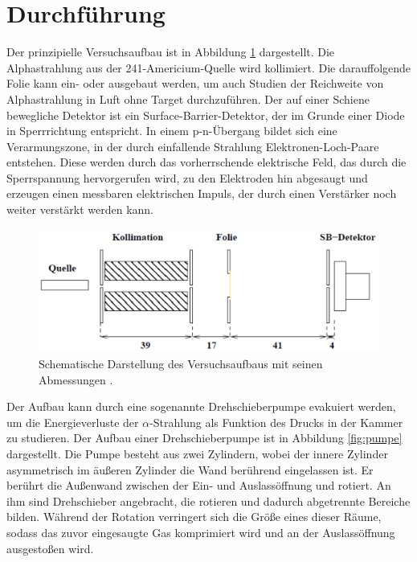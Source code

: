 \section{Durchführung}
\label{sec:Durchführung}

Der prinzipielle Versuchsaufbau ist in Abbildung \ref{fig:aufbau} dargestellt. Die Alphastrahlung aus der 241-Americium-Quelle wird kollimiert. Die darauffolgende Folie kann ein- oder ausgebaut werden, um auch Studien der Reichweite von Alphastrahlung in Luft ohne Target durchzuführen. Der auf einer Schiene bewegliche Detektor ist ein Surface-Barrier-Detektor, der im Grunde einer Diode in Sperrrichtung entspricht.
In einem p-n-Übergang bildet sich eine Verarmungszone, in der durch einfallende Strahlung Elektronen-Loch-Paare entstehen. Diese werden durch das vorherrschende elektrische Feld, das durch die Sperrspannung hervorgerufen wird, zu den Elektroden hin abgesaugt und erzeugen einen messbaren elektrischen Impuls, der durch einen Verstärker noch weiter verstärkt werden kann.

\begin{figure}
  \centering
  \includegraphics[width=\textwidth]{images/aufbau.png}
  \caption{Schematische Darstellung des Versuchsaufbaus mit seinen Abmessungen \cite{Versuchsanleitung}.}
  \label{fig:aufbau}
\end{figure}

Der Aufbau kann durch eine sogenannte Drehschieberpumpe evakuiert werden, um die Energieverluste der $\alpha$-Strahlung als Funktion des Drucks in der Kammer zu studieren. Der Aufbau einer Drehschieberpumpe ist in Abbildung \ref{fig:pumpe} dargestellt.
Die Pumpe besteht aus zwei Zylindern, wobei der innere Zylinder asymmetrisch im äußeren Zylinder die Wand berührend eingelassen ist. Er berührt die Außenwand zwischen der Ein- und Auslassöffnung und rotiert. An ihm sind Drehschieber angebracht, die rotieren und dadurch abgetrennte Bereiche bilden. Während der Rotation verringert sich die Größe eines dieser Räume, sodass das zuvor eingesaugte Gas komprimiert wird und an der Auslassöffnung ausgestoßen wird.

